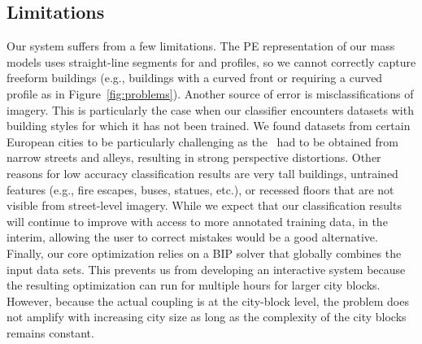 \subsection{Limitations} 
Our system suffers from a few limitations. The PE representation of our mass models uses straight-line segments for \footprintpolygons and profiles, so we cannot correctly capture freeform buildings (e.g., buildings with a curved front or requiring a curved profile as in Figure~\ref{fig:problems}).  Another source of error is misclassifications of \facade imagery. This is particularly the case when our classifier encounters datasets with building styles for which it has not been trained.
%
We found datasets from certain European cities to be particularly challenging as the \streetI\ had to be obtained from narrow streets and alleys, resulting in strong perspective distortions. Other reasons for low accuracy classification results are very tall buildings, untrained features (e.g., fire escapes, buses, statues, etc.), or recessed floors that are not visible from street-level imagery.
%
While we expect that our classification results will continue to improve with access to more annotated training data, in the interim, allowing the user to correct mistakes would be a good alternative. 
%
%
Finally, our core optimization relies on a BIP solver that globally combines the input data sets. This prevents us from developing an interactive system because the resulting optimization can run for multiple hours for larger city blocks. However, because the actual coupling is at the city-block level, the problem does not amplify with increasing city size as long as the complexity of the city blocks remains constant. 






